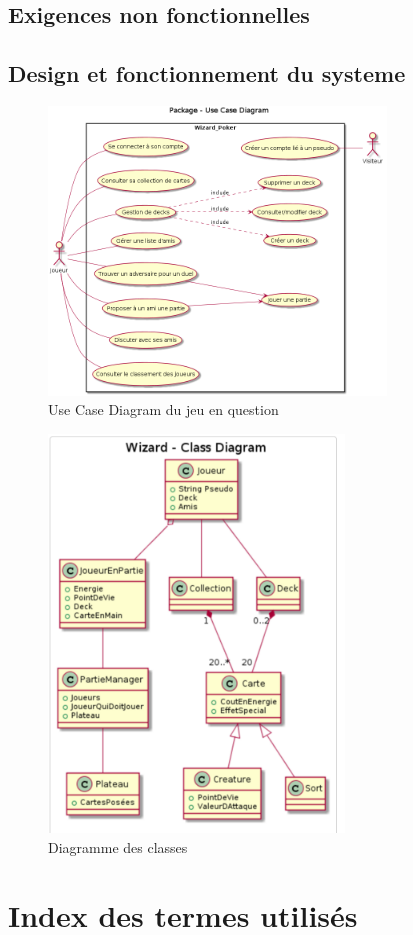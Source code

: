 \documentclass[11pt,a4paper]{article}
\begin{document}
\subsection{Exigences non fonctionnelles}
\label{sec:exi-nonfonc-sys}



\subsection{Design et fonctionnement du systeme}
\label{sec:design}


\begin{figure}[ht]
  \centering
  \includegraphics[width=0.8\textwidth]{uml_files/UseCaseDiagram.png}
  \caption{\label{fig:usecase} Use Case Diagram du jeu en question}
\end{figure}

\begin{figure}[ht]
  \centering
  \includegraphics[width=0.7\textwidth]{uml_files/ClassDiagram.png}
  \caption{\label{fig:class} Diagramme des classes}
\end{figure}


\appendix

\section{Index des termes utilisés}
\label{sec:index}
\end{document}
